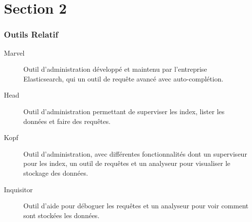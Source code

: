 \section{Section 2}\label{sec:section-2}
\begin{frame}
    \frametitle{Outils Relatif }

    \begin{description}
        \item[Marvel ] Outil d'administration développé et maintenu par l'entreprise Elasticsearch, qui un outil de requête avancé avec auto-complétion\autocite{wiki_elastic}.
        \item[Head] Outil d'administration permettant de superviser les index, lister les données et faire des requêtes\autocite{wiki_elastic}.
        \item[Kopf] Outil d'administration, avec différentes fonctionnalités dont un superviseur pour les index, un outil de requêtes et un analyseur pour visualiser le stockage des données\autocite{wiki_elastic}.
        \item[Inquisitor]  Outil d'aide pour déboguer les requêtes et un analyseur pour voir comment sont stockées les données\autocite{wiki_elastic}.
    \end{description}

\end{frame}